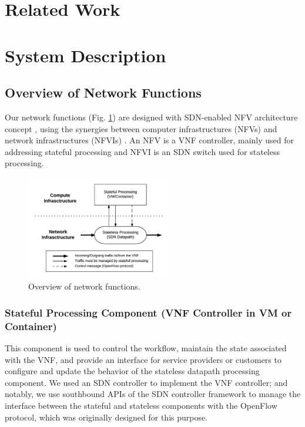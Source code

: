 \documentclass[conference]{IEEEtran}
\begin{document}
\section{Related Work}

\section{System Description}
\subsection{Overview of Network Functions} \label{ssec:desc_nfv_overview}
Our network functions (Fig. \ref{fig:desc_nfv_overview}) are designed with SDN-enabled NFV architecture concept \cite{sdn-enabled}, using the synergies between computer infrastructures (NFVs) and network infrastructures (NFVIs) \cite{nfv2014-v121, nfv2015}.
An NFV is a VNF controller, mainly used for addressing stateful processing and NFVI is an SDN switch used for stateless processing.

\begin{figure}[!t]
\centering
\includegraphics[width=2.5in]{./figures/desc_nfv_overview}
\caption{Overview of network functions.}
\label{fig:desc_nfv_overview}
\end{figure}

\subsubsection{Stateful Processing Component (VNF Controller in VM or Container)}
This component is used to control the workflow, maintain the state associated with the VNF, and provide an interface for service providers or customers to configure and update the behavior of the stateless datapath processing component. We used an SDN controller to implement the VNF controller; and notably, we use southbound APIs of the SDN controller framework to manage the interface between the stateful and stateless components with the OpenFlow protocol, which was originally designed for this purpose.
\end{document}
